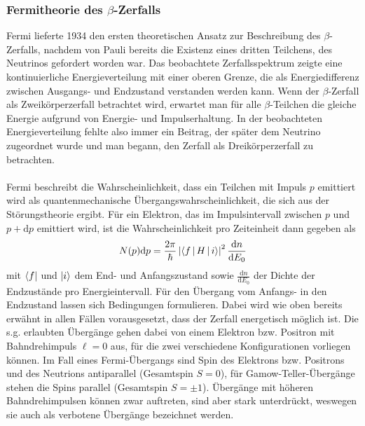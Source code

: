 \documentclass[11pt, a4paper]{article}
\numberwithin{equation}{section}
\begin{document}
\subsubsection{Fermitheorie des $\beta$-Zerfalls}
Fermi lieferte 1934 den ersten theoretischen Ansatz zur Beschreibung des $\beta$-Zerfalls, nachdem von Pauli bereits die Existenz eines dritten Teilchens, des Neutrinos gefordert worden war.
Das beobachtete Zerfallsspektrum zeigte eine kontinuierliche Energieverteilung mit einer oberen Grenze, die als Energiedifferenz zwischen Ausgangs- und Endzustand verstanden werden kann.
Wenn der $\beta$-Zerfall als Zweikörperzerfall betrachtet wird, erwartet man für alle $\beta$-Teilchen die gleiche Energie aufgrund von Energie- und Impulserhaltung.
In der beobachteten Energieverteilung fehlte also immer ein Beitrag, der später dem Neutrino zugeordnet wurde und man begann, den Zerfall als Dreikörperzerfall zu betrachten.
\\
\\
Fermi beschreibt die Wahrscheinlichkeit, dass ein Teilchen mit Impuls $p$ emittiert wird als quantenmechanische Übergangswahrscheinlichkeit, die sich aus der Störungstheorie ergibt.
Für ein Elektron, das im Impulsintervall zwischen $p$ und $p+\text{d}p$ emittiert wird, ist die Wahrscheinlichkeit pro Zeiteinheit dann gegeben als \cite{mayer-kuckuk}
\begin{align}
	N(p)\text{d}p = \frac{2\pi}{\hbar}\left|\Braket{f|H|i}\right|^2\frac{\text{d}n}{\text{d}E_0}
	\label{eq:fermispektrum}
\end{align}
mit $\bra{f}$ und $\Ket{i}$ dem End- und Anfangszustand sowie $\frac{\text{d}n}{\text{d}E_0}$ der Dichte der Endzustände pro Energieintervall.
Für den Übergang vom Anfangs- in den Endzustand lassen sich Bedingungen formulieren.
Dabei wird wie oben bereits erwähnt in allen Fällen vorausgesetzt, dass der Zerfall energetisch möglich ist.
Die s.g. erlaubten Übergänge gehen dabei von einem Elektron bzw. Positron mit Bahndrehimpuls $\ell=0$ aus, für die zwei verschiedene Konfigurationen vorliegen können.
Im Fall eines Fermi-Übergangs sind Spin des Elektrons bzw. Positrons und  des Neutrions antiparallel (Gesamtspin $S=0$), für Gamow-Teller-Übergänge stehen die Spins parallel (Gesamtspin $S=\pm1$).
Übergänge mit höheren Bahndrehimpulsen können zwar auftreten, sind aber stark unterdrückt, weswegen sie auch als verbotene Übergänge bezeichnet werden.
\end{document}
